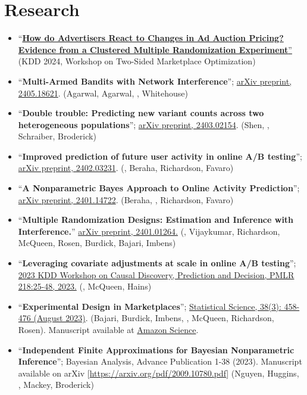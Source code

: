 \documentclass[10pt, a4paper]{article}
\newcommand{\years}[1]{\marginnote{\scriptsize #1}}
\begin{document}
\section*{Research}
\begin{itemize}
	\item ``\href{https://drive.google.com/file/d/1Pc9Zg7ygekgJ9QvAG2YUZOlPG8qszHNF/view?usp=sharing}{{\textbf{How do Advertisers React to Changes in Ad Auction Pricing? Evidence from a Clustered Multiple Randomization Experiment}}''} (KDD 2024, Workshop on Two-Sided Marketplace Optimization)
	\item ``\textbf{Multi-Armed Bandits with Network Interference}''; \href{https://arxiv.org/abs/2405.18621}{arXiv preprint, 2405.18621}. (Agarwal, Agarwal, \mm, Whitehouse)
	\item ``\textbf{Double trouble: Predicting new variant counts across two heterogeneous populations}''; \href{https://arxiv.org/pdf/2403.02154.pdf}{arXiv preprint, 2403.02154}. (Shen, \mm, Schraiber, Broderick)
	\item ``\textbf{Improved prediction of future user activity in online A/B testing}''; \href{https://arxiv.org/abs/2402.03231}{arXiv preprint, 2402.03231}. (\mm, Beraha, Richardson, Favaro)
	\item ``\textbf{A Nonparametric Bayes Approach to Online Activity Prediction}''; \href{https://arxiv.org/abs/2401.14722}{arXiv preprint, 2401.14722}. (Beraha, \mm, Richardson, Favaro)
	\item ``\textbf{Multiple Randomization Designs: Estimation and Inference with Interference.}'' \href{https://arxiv.org/abs/2401.01264}{arXiv preprint, 2401.01264.} (\mm, Vijaykumar, Richardson, McQueen, Rosen, Burdick, Bajari, Imbens) 
	\item ``\textbf{Leveraging covariate adjustments at scale in online A/B testing}''; \href{https://proceedings.mlr.press/v218/masoero23a.html}{2023 KDD Workshop on Causal Discovery, Prediction and Decision, PMLR 218:25-48, 2023.} (\mm, McQueen, Hains)
	\item ``\textbf{Experimental Design in Marketplaces}''; \href{https://projecteuclid.org/journals/statistical-science/advance-publication/Experimental-Design-in-Marketplaces/10.1214/23-STS883.short}{Statistical Science, 38(3): 458-476 (August 2023)}. (Bajari, Burdick, Imbens, \mm, McQueen, Richardson, Rosen). Manuscript available at \href{https://www.amazon.science/publications/experimental-design-in-marketplaces}{Amazon Science}.
	\item ``\textbf{Independent Finite Approximations for Bayesian Nonparametric Inference}''; Bayesian Analysis, Advance Publication 1-38 (2023). Manuscript available on arXiv [\url{https://arxiv.org/pdf/2009.10780.pdf}] (Nguyen, Huggins, \mm, Mackey, Broderick)

\end{itemize}
\end{document}

